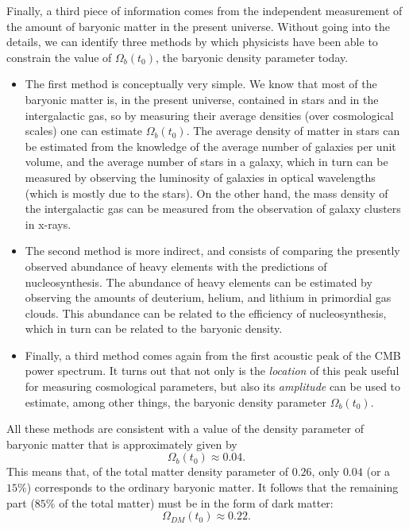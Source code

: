 Finally, a third piece of information comes from the independent measurement of the amount of baryonic matter in the present universe. Without going into the details, we can identify three methods by which physicists have been able to constrain the value of $\Omega_b(t_0)$, the baryonic density parameter today.
\begin{itemize}
\item The first method is conceptually very simple. We know that most of the baryonic matter is, in the present universe, contained in stars and in the intergalactic gas, so by measuring their average densities (over cosmological scales) one can estimate $\Omega_b(t_0)$. The average density of matter in stars can be estimated from the knowledge of the average number of galaxies per unit volume, and the average number of stars in a galaxy, which in turn can be measured by observing the luminosity of galaxies in optical wavelengths (which is mostly due to the stars). On the other hand, the mass density of the intergalactic gas can be measured from the observation of galaxy clusters in x-rays.
\item The second method is more indirect, and consists of comparing the presently observed abundance of heavy elements with the predictions of nucleosynthesis. The abundance of heavy elements can be estimated by observing the amounts of deuterium, helium, and lithium in primordial gas clouds. This abundance can be related to the efficiency of nucleosynthesis, which in turn can be related to the baryonic density.
\item Finally, a third method comes again from the first acoustic peak of the CMB power spectrum. It turns out that not only is the {\it location} of this peak useful for measuring cosmological parameters, but also its {\it amplitude} can be used to estimate, among other things, the baryonic density parameter $\Omega_b(t_0)$.
\end{itemize}

All these methods are consistent with a value of the density parameter of baryonic matter that is approximately given by
\begin{equation}
\Omega_b(t_0)\approx 0.04.
\end{equation}
This means that, of the total matter density parameter of $0.26$, only $0.04$ (or a $15\%$) corresponds to the ordinary baryonic matter. It follows that the remaining part ($85\%$ of the total matter) must be in the form of dark matter:
\begin{equation}
\Omega_{DM}(t_0)\approx 0.22.
\end{equation}

